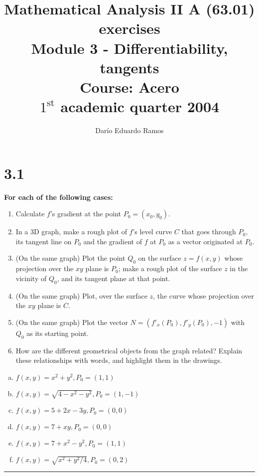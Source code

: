 \documentclass{article}
\title{Mathematical Analysis II A (63.01) exercises \\
Module 3 - Differentiability, tangents \\
Course: Acero \\
$1^{\text{st}}$ academic quarter 2004}
\author{Darío Eduardo Ramos}
\begin{document}
\maketitle

\tableofcontents{}
\newpage

\section*{3.1}
\label{sec:3.1}

\textbf{For each of the following cases:} 

\begin{enumerate}
\bfseries

\item Calculate $f$'s gradient at the point $P_0 = (x_0, y_0)$.
\item In a 3D graph, make a rough plot of $f$'s level curve $C$ that goes through $P_0$, its tangent line on $P_0$ and the gradient of $f$ at $P_0$ as a vector originated at $P_0$.
\item (On the same graph) Plot the point $Q_0$ on the surface $z = f(x,y)$ whose projection over the $xy$ plane is $P_0$; make a rough plot of the surface $z$ in the vicinity of $Q_0$, and its tangent plane at that point.
\item (On the same graph) Plot, over the surface $z$, the curve whose projection over the $xy$ plane is $C$.
\item (On the same graph) Plot the vector $N = (f'_x(P_0), f'_y(P_0), -1)$ with $Q_0$ as its starting point.
\item How are the different geometrical objects from the graph related? Explain these relationships with words, and highlight them in the drawings.

\end{enumerate}

\begin{enumerate}[(a)]
\bfseries

\item $f(x,y)=x^2+y^2, P_0 = (1,1)$
\item $f(x,y)=\sqrt{4-x^2-y^2}, P_0 = (1,-1)$
\item $f(x,y)=5+2x-3y, P_0=(0,0)$
\item $f(x,y)=7+xy, P_0=(0,0)$
\item $f(x,y)=7+x^2-y^2, P_0=(1,1)$
\item $f(x,y)=\sqrt{x^2+y^2/4}, P_0=(0,2)$

\end{enumerate}
\hrule
\end{document}
